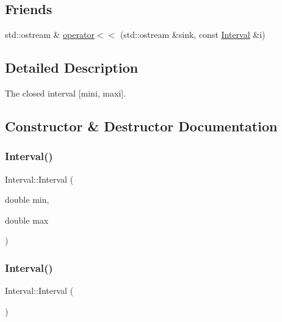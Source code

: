 \subsection*{Friends}
\begin{DoxyCompactItemize}
\item 
std\+::ostream \& \mbox{\hyperlink{classInterval_a7057e2823f722cd67f45b53382173b9f}{operator$<$$<$}} (std\+::ostream \&sink, const \mbox{\hyperlink{classInterval}{Interval}} \&i)
\end{DoxyCompactItemize}


\subsection{Detailed Description}
The closed interval \mbox{[}mini, maxi\mbox{]}. 

\subsection{Constructor \& Destructor Documentation}
\mbox{\label{classInterval_ab0a8f191fb00803d529902f85524e4e2}} 
\subsubsection{\texorpdfstring{Interval()}{Interval()}\hspace{0.1cm}{\footnotesize\ttfamily [1/2]}}
{\footnotesize\ttfamily Interval\+::\+Interval (\begin{DoxyParamCaption}\item[{double}]{min,  }\item[{double}]{max }\end{DoxyParamCaption})}

\mbox{\label{classInterval_ae48b9a9e9f672f81977627b609e32429}} 
\subsubsection{\texorpdfstring{Interval()}{Interval()}\hspace{0.1cm}{\footnotesize\ttfamily [2/2]}}
{\footnotesize\ttfamily Interval\+::\+Interval (\begin{DoxyParamCaption}{ }\end{DoxyParamCaption})}



